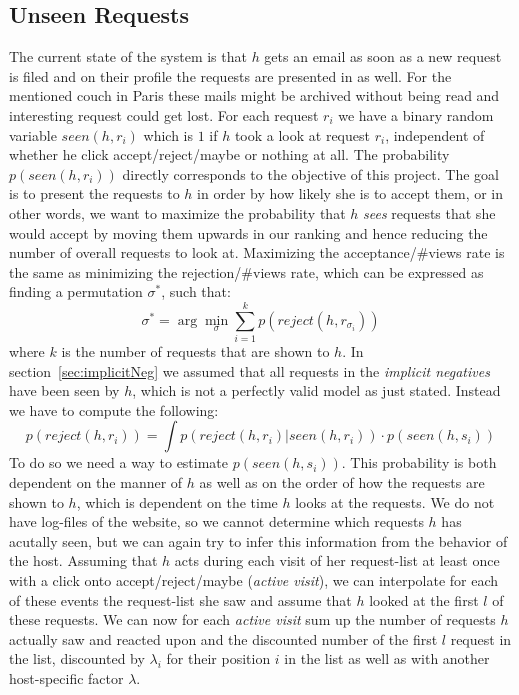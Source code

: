 \documentclass[11pt]{article}
\begin{document}
\subsection{Unseen Requests}
\label{sec:unseen}
The current state of the system is that $h$ gets an email as soon as a new request is filed and on their profile the requests are presented in  as well. For the mentioned couch in Paris these mails might be archived without being read and interesting request could get lost. For each request $r_i$ we have a binary random variable $seen(h, r_i)$ which is $1$ if $h$ took a look at request $r_i$, independent of whether he click accept/reject/maybe or nothing at all. The probability $p(seen(h,r_i))$ directly corresponds to the objective of this project. The goal is to present the requests to $h$ in order by how likely she is to accept them, or in other words, we want to maximize the probability that $h$ \textit{sees} requests that she would accept by moving them upwards in our ranking and hence reducing the number of overall requests to look at. Maximizing the acceptance/\#views rate is the same as minimizing the rejection/\#views rate, which can be expressed as finding a permutation $\sigma^*$, such that:
$$\sigma^* = \arg\min_{\sigma}\sum_{i=1}^k p(reject(h, r_{\sigma_i}))$$
where $k$ is the number of requests that are shown to $h$. 
In section~\ref{sec:implicitNeg} we assumed that all requests in the \textit{implicit negatives} have been seen by $h$, which is not a perfectly valid model as just stated. Instead we have to compute the following:
$$p(reject(h, r_i)) = \int p(reject(h, r_i)|seen(h, r_i))\cdot p(seen(h, s_i))$$
To do so we need a way to estimate $p(seen(h,s_i))$. This probability is both dependent on the manner of $h$ as well as on the order of how the requests are shown to $h$, which is dependent on the time $h$ looks at the requests. We do not have log-files of the website, so we cannot determine which requests $h$ has acutally seen, but we can again try to infer this information from the behavior of the host. Assuming that $h$ acts during each visit of her request-list at least once with a click onto accept/reject/maybe (\textit{active visit}), we can interpolate for each of these events the request-list she saw and assume that $h$ looked at the first $l$ of these requests. We can now for each \textit{active visit} sum up the number of requests $h$ actually saw and reacted upon and the discounted number of the first $l$ request in the list, discounted by $\lambda_i$ for their position $i$ in the list as well as with another host-specific factor $\lambda$.




\small

\end{document}
